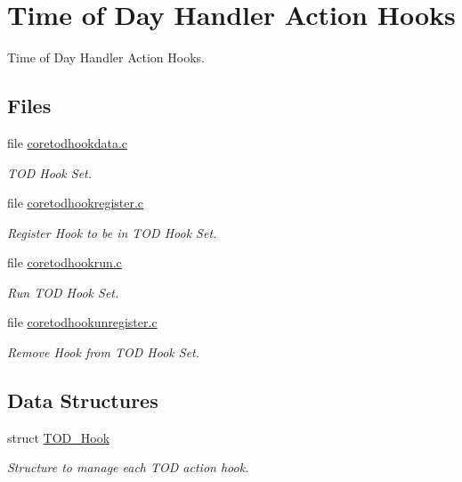 \hypertarget{group__RTEMSScoreTODHooks}{}\section{Time of Day Handler Action Hooks}
\label{group__RTEMSScoreTODHooks}


Time of Day Handler Action Hooks.  


\subsection*{Files}
\begin{DoxyCompactItemize}
\item 
file \mbox{\hyperlink{coretodhookdata_8c}{coretodhookdata.\+c}}
\begin{DoxyCompactList}\small\item\em T\+OD Hook Set. \end{DoxyCompactList}\item 
file \mbox{\hyperlink{coretodhookregister_8c}{coretodhookregister.\+c}}
\begin{DoxyCompactList}\small\item\em Register Hook to be in T\+OD Hook Set. \end{DoxyCompactList}\item 
file \mbox{\hyperlink{coretodhookrun_8c}{coretodhookrun.\+c}}
\begin{DoxyCompactList}\small\item\em Run T\+OD Hook Set. \end{DoxyCompactList}\item 
file \mbox{\hyperlink{coretodhookunregister_8c}{coretodhookunregister.\+c}}
\begin{DoxyCompactList}\small\item\em Remove Hook from T\+OD Hook Set. \end{DoxyCompactList}\end{DoxyCompactItemize}
\subsection*{Data Structures}
\begin{DoxyCompactItemize}
\item 
struct \mbox{\hyperlink{structTOD__Hook}{T\+O\+D\+\_\+\+Hook}}
\begin{DoxyCompactList}\small\item\em Structure to manage each T\+OD action hook. \end{DoxyCompactList}\end{DoxyCompactItemize}

